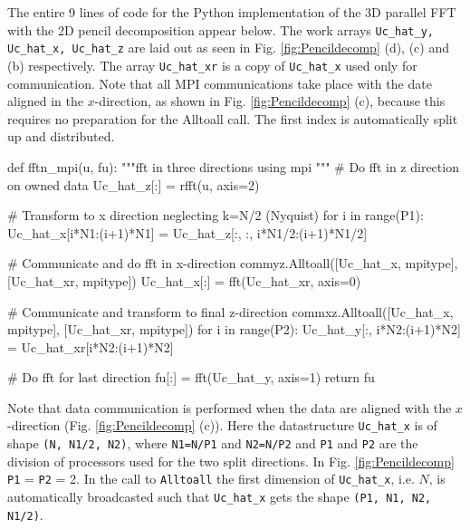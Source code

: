\documentclass[11pt, oneside]{article}
\newcommand{\inpyth}{\lstinline[style=pythonstyle, basicstyle=\ttfamily]} %[]%
\begin{document}
The entire 9 lines of code for the Python implementation of the 3D parallel FFT with the 2D pencil decomposition appear below.
The work arrays \inpyth{Uc_hat_y, Uc_hat_x, Uc_hat_z} are laid out as seen in Fig. \ref{fig:Pencildecomp} (d), (c) and (b) respectively. The array \inpyth{Uc_hat_xr} is a copy of \inpyth{Uc_hat_x} used only for communication. Note that all MPI communications take place with the date aligned in the $x$-direction, as shown in Fig. \ref{fig:Pencildecomp} (c), because this requires no preparation for the Alltoall call. The first index is automatically split up and distributed.

\begin{python}
def fftn_mpi(u, fu):
    """fft in three directions using mpi
    """    
    # Do fft in z direction on owned data
    Uc_hat_z[:] = rfft(u, axis=2)
    
    # Transform to x direction neglecting k=N/2 (Nyquist)
    for i in range(P1):
        Uc_hat_x[i*N1:(i+1)*N1] = Uc_hat_z[:, :, i*N1/2:(i+1)*N1/2]
    
    # Communicate and do fft in x-direction
    commyz.Alltoall([Uc_hat_x, mpitype], [Uc_hat_xr, mpitype])
    Uc_hat_x[:] = fft(Uc_hat_xr, axis=0)        
    
    # Communicate and transform to final z-direction
    commxz.Alltoall([Uc_hat_x, mpitype], [Uc_hat_xr, mpitype])    
    for i in range(P2): 
        Uc_hat_y[:, i*N2:(i+1)*N2] = Uc_hat_xr[i*N2:(i+1)*N2]
                                   
    # Do fft for last direction 
    fu[:] = fft(Uc_hat_y, axis=1)
    return fu
\end{python}
Note that data communication is performed when the data are aligned with the $x$-direction (Fig. \ref{fig:Pencildecomp} (c)). Here the datastructure \inpyth{Uc_hat_x} is of shape \inpyth{(N, N1/2, N2)}, where \inpyth{N1=N/P1} and \inpyth{N2=N/P2} and \inpyth{P1} and \inpyth{P2} are the division of processors used for the two split directions. In Fig. \ref{fig:Pencildecomp} \inpyth{P1} = \inpyth{P2} = 2. In the call to \inpyth{Alltoall} the first dimension of \inpyth{Uc_hat_x}, i.e. $N$, is automatically broadcasted such that \inpyth{Uc_hat_x} gets the shape \inpyth{(P1, N1, N2, N1/2)}.
\end{document}
